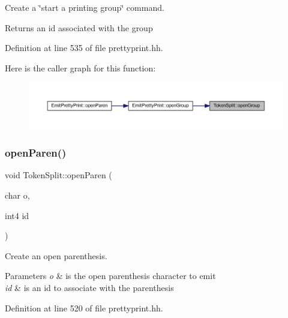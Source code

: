 Create a \char`\"{}start a printing group\char`\"{} command. 

\begin{DoxyReturn}{Returns}
an id associated with the group 
\end{DoxyReturn}


Definition at line 535 of file prettyprint.\+hh.

Here is the caller graph for this function\+:
\nopagebreak
\begin{figure}[H]
\begin{center}
\leavevmode
\includegraphics[width=350pt]{class_token_split_a467d591af196f9a606dd50586775f7d4_icgraph}
\end{center}
\end{figure}
\mbox{\label{class_token_split_a5dcdb16c6b0aafe649f1615a93c2ee1c}} 
\subsubsection{\texorpdfstring{openParen()}{openParen()}}
{\footnotesize\ttfamily void Token\+Split\+::open\+Paren (\begin{DoxyParamCaption}\item[{char}]{o,  }\item[{int4}]{id }\end{DoxyParamCaption})\hspace{0.3cm}{\ttfamily [inline]}}



Create an open parenthesis. 


\begin{DoxyParams}{Parameters}
{\em o} & is the open parenthesis character to emit \\
\hline
{\em id} & is an id to associate with the parenthesis \\
\hline
\end{DoxyParams}


Definition at line 520 of file prettyprint.\+hh.

